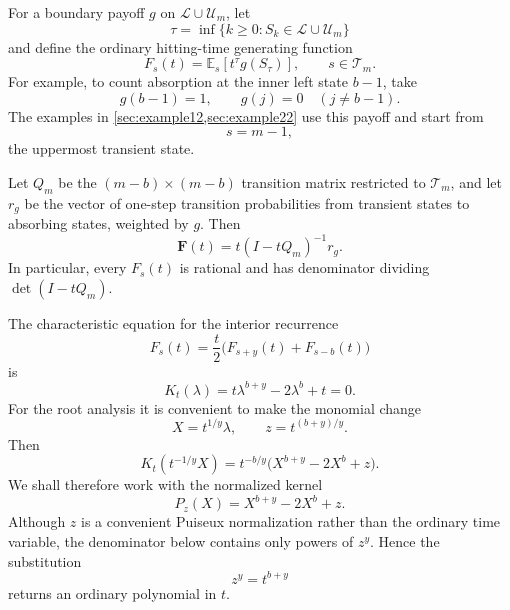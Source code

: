\documentclass[11pt]{amsart}
\theoremstyle{remark}
\begin{document}
For a boundary payoff $g$ on $\mathcal L\cup\mathcal U_m$, let
\[
    \tau=\inf\{k\ge0:S_k\in\mathcal L\cup\mathcal U_m\}
\]
and define the ordinary hitting-time generating function
\begin{equation}\label{eq:physical-gf}
    F_s(t)=\mathbb E_s\!\left[t^\tau g(S_\tau)\right],
    \qquad s\in\mathcal T_m.
\end{equation}
For example, to count absorption at the inner left state $b-1$, take
\[
    g(b-1)=1,
    \qquad
    g(j)=0\quad(j\ne b-1).
\]
The examples in \cref{sec:example12,sec:example22} use this payoff and start from
\begin{equation}\label{eq:startstate}
    s=m-1,
\end{equation}
the uppermost transient state.

Let $Q_m$ be the $(m-b)\times(m-b)$ transition matrix restricted to $\mathcal T_m$, and let $r_g$ be the vector of one-step transition probabilities from transient states to absorbing states, weighted by $g$.  Then
\begin{equation}\label{eq:resolvent}
    \mathbf F(t)=t(I-tQ_m)^{-1}r_g.
\end{equation}
In particular, every $F_s(t)$ is rational and has denominator dividing $\det(I-tQ_m)$.

The characteristic equation for the interior recurrence
\[
    F_s(t)=\frac t2\bigl(F_{s+y}(t)+F_{s-b}(t)\bigr)
\]
is
\begin{equation}\label{eq:physical-kernel}
    K_t(\lambda)=t\lambda^{b+y}-2\lambda^b+t=0.
\end{equation}
For the root analysis it is convenient to make the monomial change
\begin{equation}\label{eq:normalization}
    X=t^{1/y}\lambda,
    \qquad
    z=t^{(b+y)/y}.
\end{equation}
Then
\begin{equation}\label{eq:kernel-normalization}
    K_t(t^{-1/y}X)
    =t^{-b/y}\bigl(X^{b+y}-2X^b+z\bigr).
\end{equation}
We shall therefore work with the normalized kernel
\[
    P_z(X)=X^{b+y}-2X^b+z.
\]
Although $z$ is a convenient Puiseux normalization rather than the ordinary time variable, the denominator below contains only powers of $z^y$.  Hence the substitution
\begin{equation}\label{eq:zytn}
    z^y=t^{b+y}
\end{equation}
returns an ordinary polynomial in $t$.
\end{document}
